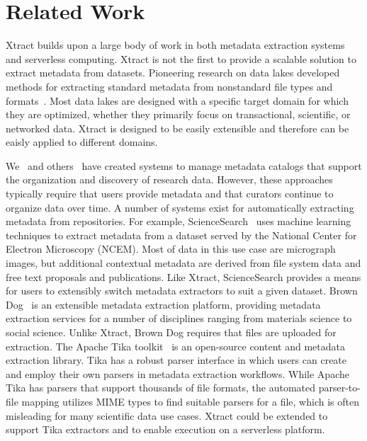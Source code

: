 \documentclass[sigconf]{acmart}
\newcommand{\ryan}[1]{}
\newcommand{\ryan}[1]{{\textcolor{magenta}{ Ryan: #1 }}}
\newcommand{\name}{Xtract}
\begin{document}
\section{Related Work}
\label{sec:related}

\name{} builds upon a large body of work in both metadata extraction systems and serverless computing. 
\name{} is not the first to provide a scalable solution to extract metadata from datasets.
Pioneering research on data lakes developed methods for 
extracting standard metadata from nonstandard file types and formats~\cite{terrizzano2015data}. 
Most data lakes are designed with a specific target domain for which they are optimized, 
whether they primarily focus on transactional, scientific, or networked data. 
\name{} is designed to be easily extensible and therefore can be eaisly applied
to different domains. 

We~\cite{wozniak15bigdata} and others~\cite{egan2003vizier, welter2013nhgri, irods, dataverse} have created 
systems to manage metadata catalogs that
support the organization and discovery of research data. However, these approaches typically 
require that users provide metadata and that curators continue to organize data over time. 
A number of systems exist for automatically extracting metadata from repositories. 
For example, ScienceSearch~\cite{rodrigo2018sciencesearch} uses 
machine learning techniques to extract metadata from a dataset served by the National Center for Electron Microscopy (NCEM). 
Most of data in this use case are micrograph images, but additional contextual metadata are derived from file system 
data and free text proposals and publications. Like \name{}, ScienceSearch 
provides a means for users to extensibly switch metadata extractors to suit a given dataset.  
Brown Dog~\cite{padhy2015brown} is an extensible metadata extraction platform, 
providing metadata extraction services for a number of 
disciplines ranging from materials science to social science.
Unlike \name{}, Brown Dog requires that files are uploaded for extraction. 
The Apache Tika toolkit~\cite{mattmann2011tika} is an open-source content and metadata extraction library. 
Tika has a robust parser interface in which users can create and 
employ their own parsers in metadata extraction workflows. 
While Apache Tika has parsers that support thousands of file formats, the automated parser-to-file mapping 
utilizes MIME types to find suitable parsers for a file, which is often misleading for many scientific data
use cases. \name{} could be extended to support Tika extractors and to enable
execution on a serverless platform. %
\end{document}
